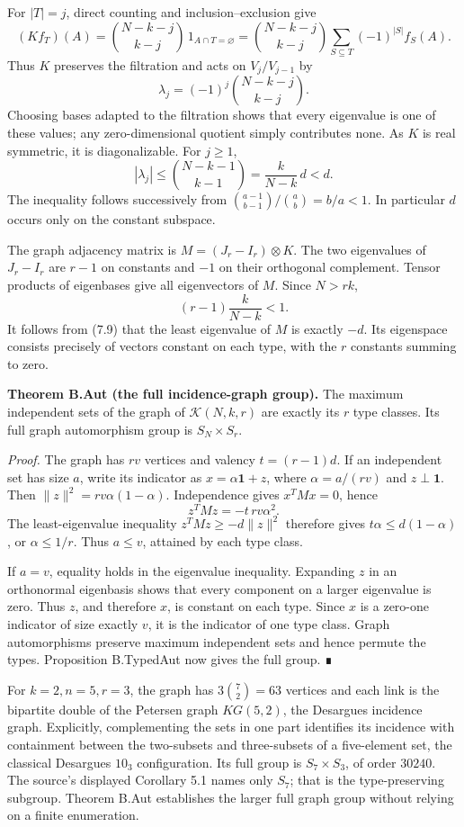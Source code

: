 \documentclass[
  11pt,
  a4paper,
]{article}
\begin{document}
For \(|T|=j\), direct counting and inclusion--exclusion give \[
(Kf_T)(A)=\binom{N-k-j}{k-j}\,1_{A\cap T=\varnothing}
=\binom{N-k-j}{k-j}\sum_{S\subseteq T}(-1)^{|S|}f_S(A).
\tag{7.7}
\] Thus \(K\) preserves the filtration and acts on \(V_j/V_{j-1}\) by \[
\lambda_j=(-1)^j\binom{N-k-j}{k-j}.
\tag{7.8}
\] Choosing bases adapted to the filtration shows that every eigenvalue
is one of these values; any zero-dimensional quotient simply contributes
none. As \(K\) is real symmetric, it is diagonalizable. For \(j\geq1\),
\[
|\lambda_j|\leq\binom{N-k-1}{k-1}
=\frac{k}{N-k}\,d<d.
\tag{7.9}
\] The inequality follows successively from
\(\binom{a-1}{b-1}/\binom ab=b/a<1\). In particular \(d\) occurs only on
the constant subspace.

The graph adjacency matrix is \(M=(J_r-I_r)\otimes K\). The two
eigenvalues of \(J_r-I_r\) are \(r-1\) on constants and \(-1\) on their
orthogonal complement. Tensor products of eigenbases give all
eigenvectors of \(M\). Since \(N>rk\), \[
(r-1)\frac{k}{N-k}<1.
\tag{7.10}
\] It follows from (7.9) that the least eigenvalue of \(M\) is exactly
\(-d\). Its eigenspace consists precisely of vectors constant on each
type, with the \(r\) constants summing to zero.

\textbf{Theorem B.Aut (the full incidence-graph group).} The maximum
independent sets of the graph of \(\mathcal K(N,k,r)\) are exactly its
\(r\) type classes. Its full graph automorphism group is
\(S_N\times S_r\).

\emph{Proof.} The graph has \(rv\) vertices and valency \(t=(r-1)d\). If
an independent set has size \(a\), write its indicator as
\(x=\alpha\mathbf1+z\), where \(\alpha=a/(rv)\) and \(z\perp\mathbf1\).
Then \(\|z\|^2=rv\alpha(1-\alpha)\). Independence gives \(x^TMx=0\),
hence \[
z^TMz=-t\,rv\alpha^2.
\] The least-eigenvalue inequality \(z^TMz\geq-d\|z\|^2\) therefore
gives \(t\alpha\leq d(1-\alpha)\), or \(\alpha\leq1/r\). Thus
\(a\leq v\), attained by each type class.

If \(a=v\), equality holds in the eigenvalue inequality. Expanding \(z\)
in an orthonormal eigenbasis shows that every component on a larger
eigenvalue is zero. Thus \(z\), and therefore \(x\), is constant on each
type. Since \(x\) is a zero-one indicator of size exactly \(v\), it is
the indicator of one type class. Graph automorphisms preserve maximum
independent sets and hence permute the types. Proposition B.TypedAut now
gives the full group. ∎

For \(k=2,n=5,r=3\), the graph has \(3\binom72=63\) vertices and each
link is the bipartite double of the Petersen graph \(KG(5,2)\), the
Desargues incidence graph. Explicitly, complementing the sets in one
part identifies its incidence with containment between the two-subsets
and three-subsets of a five-element set, the classical Desargues
\(10_3\) configuration. Its full group is \(S_7\times S_3\), of order
\(30240\). The source's displayed Corollary 5.1 names only \(S_7\); that
is the type-preserving subgroup. Theorem B.Aut establishes the larger
full graph group without relying on a finite enumeration.
\end{document}
